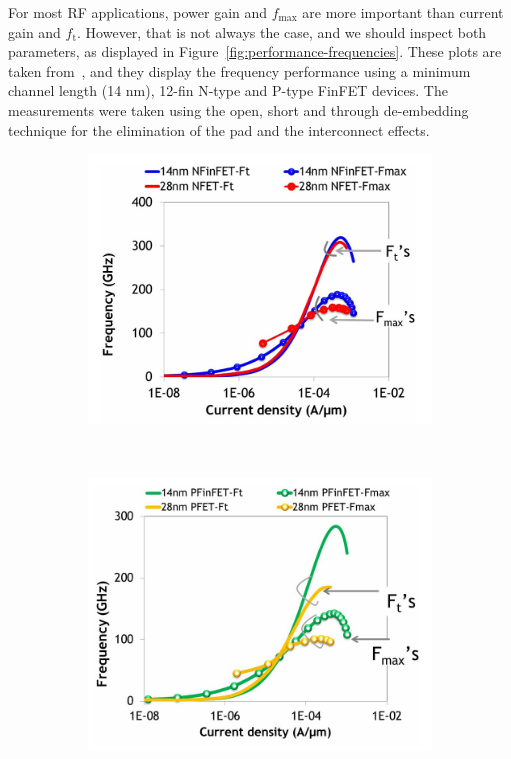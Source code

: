 \documentclass[11pt,a4paper]{article}
\begin{document}
        For most RF applications, power gain and $f_{\mathrm{max}}$ are more important than current gain and $f_{\mathrm{t}}$. However, that is not always the case, and we should inspect both parameters, as displayed in Figure~\ref{fig:performance-frequencies}. These plots are taken from~\cite{singh:14nm-finfet-analog-and-rf-applications}, and they display the frequency performance using a minimum channel length (14 nm), 12-fin N-type and P-type FinFET devices. The measurements were taken using the open, short and through de-embedding technique for the elimination of the pad and the interconnect effects.
        \begin{figure}[!ht]
            \centering
            \begin{subfigure}{.45\textwidth}
                \centering
                \includegraphics[width=\textwidth]{src/frequencies-ntype.png}
            \end{subfigure}
            ~
            \begin{subfigure}{.45\textwidth}
                \centering
                \includegraphics[width=\textwidth]{src/frequencies-ptype.png}

\end{subfigure}
\end{figure}
\end{document}
